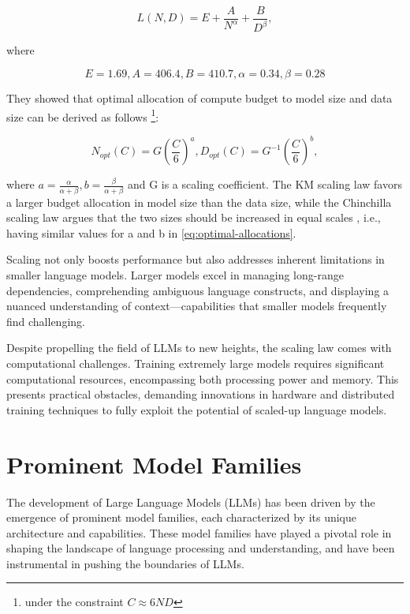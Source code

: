 \begin{enumerate}
{        \[L(N,D) = E + \frac{A}{N^\alpha} + \frac{B}{D^\beta},\]

        where

        \[E=1.69, A=406.4,B = 410.7, \alpha = 0.34, \beta = 0.28\]

        They showed that optimal allocation of compute budget to model size and data size can be derived as follows \footnote{under the constraint \(C \approx 6ND\)}:

        \begin{center}
            \begin{equation}
                N_{opt}(C) = G(\frac{C}{6})^a, D_{opt}(C) = G^{-1}(\frac{C}{6})^b, \label{eq:optimal-allocations}
            \end{equation}
        \end{center}

        where \(a=\frac{\alpha}{\alpha+\beta}, b=\frac{\beta}{\alpha+\beta}\) and G is a scaling coefficient.
        The KM scaling law favors a larger budget allocation in model size than the data size, while the Chinchilla scaling law argues that the two sizes should be increased in equal scales \cite{scaling2}, i.e., having similar values for a and b in \eqref{eq:optimal-allocations}.
    }
\end{enumerate}

Scaling not only boosts performance but also addresses inherent limitations in smaller language models.
Larger models excel in managing long-range dependencies, comprehending ambiguous language constructs, and displaying a nuanced understanding of context---capabilities that smaller models frequently find challenging.

Despite propelling the field of LLMs to new heights, the scaling law comes with computational challenges.
Training extremely large models requires significant computational resources, encompassing both processing power and memory.
This presents practical obstacles, demanding innovations in hardware and distributed training techniques to fully exploit the potential of scaled-up language models.


\section{Prominent Model Families}
\label{sec:promiment-model-families}

The development of Large Language Models (LLMs) has been driven by the emergence of prominent model families, each characterized by its unique architecture and capabilities.
These model families have played a pivotal role in shaping the landscape of language processing and understanding, and have been instrumental in pushing the boundaries of LLMs.

